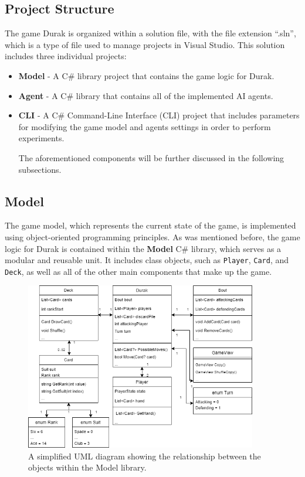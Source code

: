 \subsection{Project Structure}
The game Durak is organized within a solution file, with the file extension ``.sln'', which is a type of file used to manage projects in Visual Studio. This solution includes three individual projects: 

\begin{itemize}

\item \textbf{Model} - A C\# library project that contains the game logic for Durak.

\item \textbf{Agent} - A C\# library that contains all of the implemented AI agents.

\item \textbf{CLI} - A C\# Command-Line Interface (CLI) project that includes parameters for modifying the game model and agents settings in order to perform experiments.

The aforementioned components will be further discussed in the following subsections.

\end{itemize}

\subsection{Model}

The game model, which represents the current state of the game, is implemented using object-oriented programming principles. As was mentioned before, the game logic for Durak is contained within the \textbf{Model} C\# library, which serves as a modular and reusable unit. It includes class objects, such as \texttt{Player}, \texttt{Card}, and \texttt{Deck}, as well as all of the other main components that make up the game. 

\begin{figure}[h]
    \centering
    \captionsetup{justification=centering}
    \includegraphics[width=0.9\textwidth]{../img/modelUML.png}
    \caption{A simplified UML diagram showing the relationship between the objects within the Model library.}
    \label{fig:modelUML}
\end{figure}

